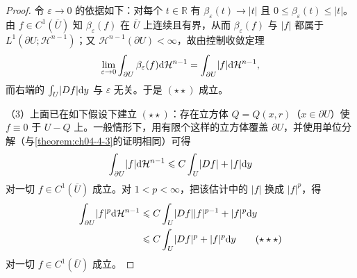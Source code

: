 \documentclass[../../main.tex]{subfiles}%
\begin{document}
\begin{proof}
令 $\varepsilon\to0$ 的依据如下：对每个 $t\in\mathbb{R}$ 有 $\beta_\varepsilon(t)\to\lvert t\rvert$ 且 $0\leqslant\beta_\varepsilon(t)\leqslant\lvert t\rvert$。由 $f\in C^1(\overline{U})$ 知 $\beta_\varepsilon(f)$ 在 $\overline{U}$ 上连续且有界，从而 $\beta_\varepsilon(f)$ 与 $\lvert f\rvert$ 都属于 $L^1(\partial U;\mathcal{H}^{n-1})$；又 $\mathcal{H}^{n-1}(\partial U)<\infty$，故由控制收敛定理
\begin{align*}
\lim_{\varepsilon\to0}\int_{\partial U}\beta_\varepsilon(f)\mathrm{d}\mathcal{H}^{n-1}=\int_{\partial U}\lvert f\rvert\mathrm{d}\mathcal{H}^{n-1},
\end{align*}
而右端的 $\int_U\lvert Df\rvert\mathrm{d} y$ 与 $\varepsilon$ 无关。于是 $(\star\star)$ 成立。

（3）上面已在如下假设下建立 $(\star\star)$：存在立方体 $Q=Q(x,r)$（$x\in\partial U$）使 $f\equiv0$ 于 $U-Q$ 上。一般情形下，用有限个这样的立方体覆盖 $\partial U$，并使用单位分解（与\cref{theorem:ch04-4-3}的证明相同）可得 %
\begin{align*}
\int_{\partial U}\lvert f\rvert\mathrm{d}\mathcal{H}^{n-1}\leqslant C\int_U\lvert Df\rvert+\lvert f\rvert\mathrm{d} y
\end{align*}
对一切 $f\in C^1(\overline{U})$ 成立。对 $1<p<\infty$，把该估计中的 $\lvert f\rvert$ 换成 $\lvert f\rvert^p$，得
\begin{align*}
\int_{\partial U}\lvert f\rvert^p\mathrm{d}\mathcal{H}^{n-1}
&\leqslant C\int_U\lvert Df\rvert\lvert f\rvert^{p-1}+\lvert f\rvert^p\mathrm{d} y\\
&\leqslant C\int_U\lvert Df\rvert^p+\lvert f\rvert^p\mathrm{d} y \qquad(\star\star\star)
\end{align*}
对一切 $f\in C^1(\overline{U})$ 成立。


\end{proof}
\end{document}

